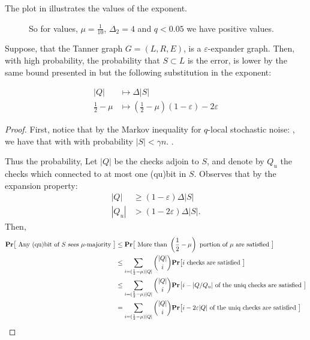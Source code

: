 \documentclass[manuscript,screen,review]{acmart}
\begin{document}
The plot in  illustrates the values of the exponent. 

\begin{figure}[h]
  \centering

  \caption{ So for values, $\mu = \frac{1}{10}$, $\Delta_{2}=4$ and $q< 0.05$ we have positive values.}
  \label{fig:qpow}
\end{figure}

\begin{claim}
  Suppose, that the Tanner graph $G = (L,R,E)$, is a $\varepsilon$-expander graph. Then, with high probability, the probability that $S \subset L$ is the error, is lower by the same bound presented in  but the following substitution in the exponent: 

  \begin{equation*}
    \begin{split}
      |Q| & \mapsto \Delta |S| \\
      \frac{1}{2} - \mu  & \mapsto  \left( \frac{1}{2} - \mu \right)\left( 1 - \varepsilon \right) - 2\varepsilon
    \end{split}
  \end{equation*}
\end{claim}

\begin{proof}
  First, notice that by the Markov inequality for $q$-local stochastic noise: , we have that with with probability $|S| < \gamma n$. .

  Thus the probability, Let $|Q|$ be the checks adjoin to $S$, and denote by $Q_{u}$ the checks which connected to at most one (qu)bit in $S$. Observes that by the expansion property:  
  \begin{equation*}
    \begin{split}
|Q|  & \ge (1-\varepsilon) \Delta |S| \\
|Q_{u}| & > (1 - 2\varepsilon)\Delta |S|.
    \end{split}
  \end{equation*}
  Then, 
  \begin{equation*}
    \begin{split}
      \mathbf{Pr} \big[  \text{  Any (qu)bit of }  S \text{ sees } \mu \text{-majority }  \big] & \le  \mathbf{Pr} \big[  \text{  More than  } \left( \frac{1}{2} - \mu \right)   \text{ portion of  } \mu \text{ are satisfied }  \big]  \\
      &   \le \sum_{i = (\frac{1}{2} - \mu ) |Q|}{{|Q| \choose  i }  \mathbf{Pr} \big[  i \text{ checks are satisfied }  \big] } \\
      &   \le \sum_{i = (\frac{1}{2} - \mu ) |Q|}{{|Q| \choose  i }  \mathbf{Pr} \big[  i - |Q/Q_{u}| \text{ of the uniq checks are satisfied }  \big] }  \\
      &   = \sum_{i = (\frac{1}{2} - \mu ) |Q|}{{|Q| \choose  i }  \mathbf{Pr} \big[  i - 2\varepsilon |Q| \text{ of the uniq checks are satisfied }  \big] }  
    \end{split}
  \end{equation*}

\end{proof}
\end{document}
